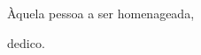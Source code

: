 \chapter*{}
\thispagestyle{empty}
\setcounter{page}{3} %
\vspace{18.cm}

\begin{flushright}
  
  Àquela pessoa a ser homenageada,
  
  dedico.
   \end{flushright}
